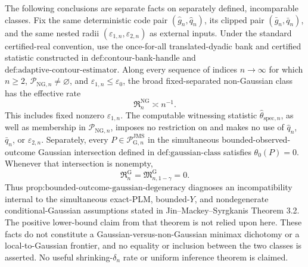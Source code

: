 The following conclusions are separate facts on separately defined, incomparable classes.  Fix the same deterministic code pair \((\widehat g_n,\widehat q_n)\), its clipped pair \((\bar g_n,\bar q_n)\), and the same nested radii \((\varepsilon_{1,n},\varepsilon_{2,n})\) as external inputs.  Under the standard certified-real convention, use the once-for-all translated-dyadic bank and certified statistic constructed in \(\text{def:contour-bank-handle}\) and \(\text{def:adaptive-contour-estimator}\).  Along every sequence of indices \(n\to\infty\) for which \(n\ge2\), \(\mathcal P_{\mathrm{NG},n}\neq\varnothing\), and \(\varepsilon_{1,n}\le\varepsilon_0\), the broad fixed-separated non-Gaussian class has the effective rate
\[
 \mathfrak R_n^{\mathrm{NG}}\asymp n^{-1}.
\]
This includes fixed nonzero \(\varepsilon_{1,n}\).  The computable witnessing statistic \(\widehat\theta_{\mathrm{spec},n}\), as well as membership in \(\mathcal P_{\mathrm{NG},n}\), imposes no restriction on and makes no use of \(\widehat q_n\), \(\bar q_n\), or \(\varepsilon_{2,n}\).  Separately, every \(P\in\mathcal P_{\mathrm G,n}^{\mathrm{JMS}}\) in the simultaneous bounded-observed-outcome Gaussian intersection defined in \(\text{def:gaussian-class}\) satisfies \(\theta_0(P)=0\).  Whenever that intersection is nonempty,
\[
 \mathfrak R_n^{\mathrm G}
 =\mathfrak M_{n,1-\gamma}^{\mathrm G}
 =0.
\]
Thus \(\text{prop:bounded-outcome-gaussian-degeneracy}\) diagnoses an incompatibility internal to the simultaneous exact-PLM, bounded-\(Y\), and nondegenerate conditional-Gaussian assumptions stated in Jin--Mackey--Syrgkanis Theorem 3.2.  The positive lower-bound claim from that theorem is not relied upon here.  These facts do not constitute a Gaussian-versus-non-Gaussian minimax dichotomy or a local-to-Gaussian frontier, and no equality or inclusion between the two classes is asserted.  No useful shrinking-\(\delta_n\) rate or uniform inference theorem is claimed.